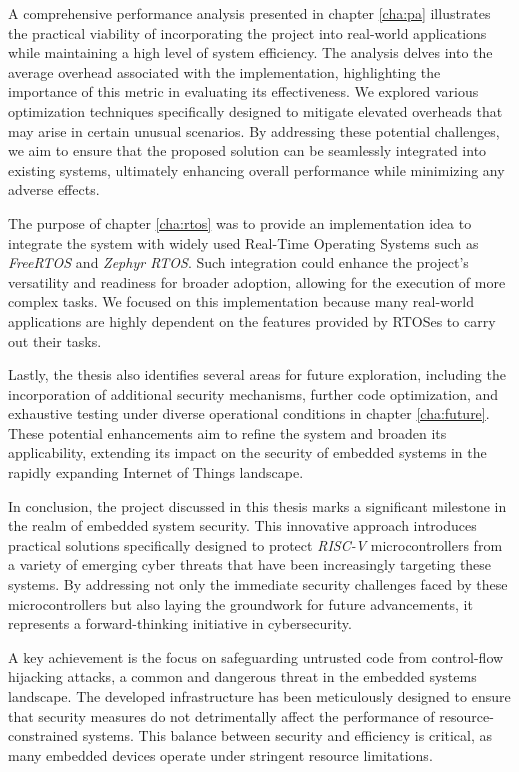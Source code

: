 A comprehensive performance analysis presented in chapter \ref{cha:pa}
illustrates the practical viability of incorporating the project into real-world
applications while maintaining a high level of system efficiency. The analysis delves
into the average overhead associated with the implementation, highlighting the
importance of this metric in evaluating its effectiveness. We explored various optimization
techniques specifically designed to mitigate elevated overheads that may arise in
certain unusual scenarios. By addressing these potential challenges, we aim to ensure
that the proposed solution can be seamlessly integrated into existing systems,
ultimately enhancing overall performance while minimizing any adverse effects.

The purpose of chapter \ref{cha:rtos} was to provide an implementation idea to
integrate the system with widely used Real-Time Operating Systems such as
\textit{FreeRTOS} and \textit{Zephyr RTOS}. Such integration could enhance the project's
versatility and readiness for broader adoption, allowing for the execution of
more complex tasks. We focused on this implementation because many real-world applications
are highly dependent on the features provided by RTOSes to carry out their tasks.

Lastly, the thesis also identifies several areas for future exploration, including
the incorporation of additional security mechanisms, further code optimization, and
exhaustive testing under diverse operational conditions in chapter \ref{cha:future}.
These potential enhancements aim to refine the system and broaden its
applicability, extending its impact on the security of embedded systems in the rapidly
expanding Internet of Things landscape.

In conclusion, the project discussed in this thesis marks a significant
milestone in the realm of embedded system security. This innovative approach introduces
practical solutions specifically designed to protect \textit{RISC-V}
microcontrollers from a variety of emerging cyber threats that have been
increasingly targeting these systems. By addressing not only the immediate security
challenges faced by these microcontrollers but also laying the groundwork for future
advancements, it represents a forward-thinking initiative in cybersecurity.

A key achievement is the focus on safeguarding untrusted code from control-flow
hijacking attacks, a common and dangerous threat in the embedded systems landscape.
The developed infrastructure has been meticulously designed to ensure that
security measures do not detrimentally affect the performance of resource-constrained
systems. This balance between security and efficiency is critical, as many
embedded devices operate under stringent resource limitations.

